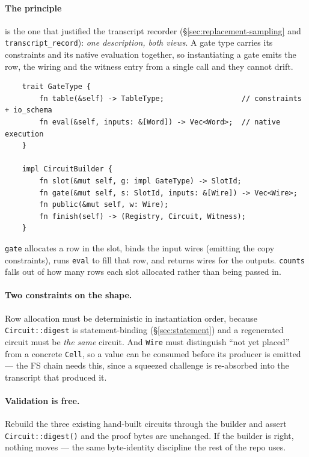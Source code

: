 \documentclass[11pt]{article}
\newcommand{\code}[1]{\texttt{#1}}
\theoremstyle{definition}
\begin{document}
\paragraph{The principle} is the one that justified the transcript recorder
(\S\ref{sec:replacement-sampling} and \code{transcript\_record}): \emph{one
description, both views}. A gate type carries its constraints and its native
evaluation together, so instantiating a gate emits the row, the wiring and
the witness entry from a single call and they cannot drift.

\begin{verbatim}
    trait GateType {
        fn table(&self) -> TableType;                  // constraints + io_schema
        fn eval(&self, inputs: &[Word]) -> Vec<Word>;  // native execution
    }

    impl CircuitBuilder {
        fn slot(&mut self, g: impl GateType) -> SlotId;
        fn gate(&mut self, s: SlotId, inputs: &[Wire]) -> Vec<Wire>;
        fn public(&mut self, w: Wire);
        fn finish(self) -> (Registry, Circuit, Witness);
    }
\end{verbatim}

\code{gate} allocates a row in the slot, binds the input wires (emitting the
copy constraints), runs \code{eval} to fill that row, and returns wires for
the outputs. \code{counts} falls out of how many rows each slot allocated
rather than being passed in.

\paragraph{Two constraints on the shape.} Row allocation must be
deterministic in instantiation order, because \code{Circuit::digest} is
statement-binding (\S\ref{sec:statement}) and a regenerated circuit must be
\emph{the same} circuit. And \code{Wire} must distinguish ``not yet placed''
from a concrete \code{Cell}, so a value can be consumed before its producer
is emitted --- the FS chain needs this, since a squeezed challenge is
re-absorbed into the transcript that produced it.

\paragraph{Validation is free.} Rebuild the three existing hand-built
circuits through the builder and assert \code{Circuit::digest()} and the
proof bytes are unchanged. If the builder is right, nothing moves --- the
same byte-identity discipline the rest of the repo uses.
\end{document}
